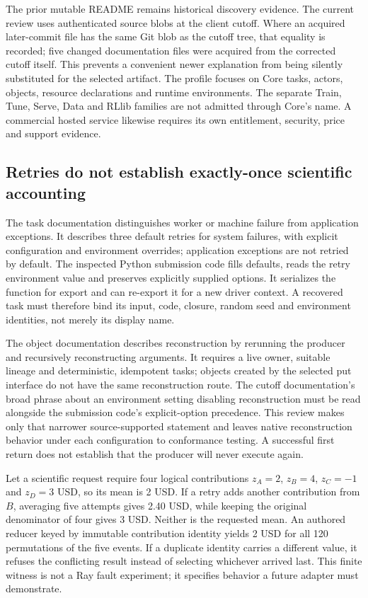 The prior mutable README remains historical discovery evidence. The current review uses authenticated source blobs at the client cutoff. Where an acquired later-commit file has the same Git blob as the cutoff tree, that equality is recorded; five changed documentation files were acquired from the corrected cutoff itself. This prevents a convenient newer explanation from being silently substituted for the selected artifact. The profile focuses on Core tasks, actors, objects, resource declarations and runtime environments. The separate Train, Tune, Serve, Data and RLlib families are not admitted through Core's name. A commercial hosted service likewise requires its own entitlement, security, price and support evidence.~\citep{exec24_ray_sources,exec24_ray_contract}

\subsection{Retries do not establish exactly-once scientific accounting}
The task documentation distinguishes worker or machine failure from application exceptions. It describes three default retries for system failures, with explicit configuration and environment overrides; application exceptions are not retried by default. The inspected Python submission code fills defaults, reads the retry environment value and preserves explicitly supplied options. It serializes the function for export and can re-export it for a new driver context. A recovered task must therefore bind its input, code, closure, random seed and environment identities, not merely its display name.~\citep{exec24_ray_sources}

The object documentation describes reconstruction by rerunning the producer and recursively reconstructing arguments. It requires a live owner, suitable lineage and deterministic, idempotent tasks; objects created by the selected put interface do not have the same reconstruction route. The cutoff documentation's broad phrase about an environment setting disabling reconstruction must be read alongside the submission code's explicit-option precedence. This review makes only that narrower source-supported statement and leaves native reconstruction behavior under each configuration to conformance testing. A successful first return does not establish that the producer will never execute again.~\citep{exec24_ray_sources}

Let a scientific request require four logical contributions $z_A=2$, $z_B=4$, $z_C=-1$ and $z_D=3$ USD, so its mean is 2 USD. If a retry adds another contribution from $B$, averaging five attempts gives 2.40 USD, while keeping the original denominator of four gives 3 USD. Neither is the requested mean. An authored reducer keyed by immutable contribution identity yields 2 USD for all 120 permutations of the five events. If a duplicate identity carries a different value, it refuses the conflicting result instead of selecting whichever arrived last. This finite witness is not a Ray fault experiment; it specifies behavior a future adapter must demonstrate.~\citep{exec24_ray_contract}

